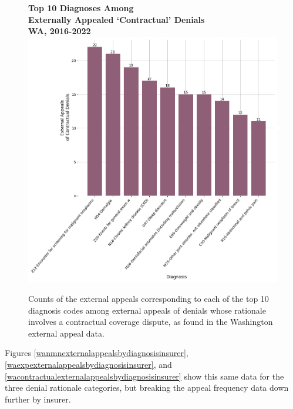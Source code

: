 \documentclass[12pt, a4paper,twoside,parskip=full]{report}
\theoremstyle{plain} %
\theoremstyle{definition} %
\theoremstyle{remark} %
\numberwithin{equation}{chapter}
\begin{document}
		\begin{figure}[h!]
			\centering
			\textbf{Top 10 Diagnoses Among}\\
			\textbf{Externally Appealed `Contractual' Denials}\\ 
			\textbf{WA, 2016-2022}\\
			\includegraphics[width=.8\textwidth]{images/wa_external_appeals/top_contractual_appeal_diagnoses.png}
			\caption{Counts of the external appeals corresponding to each of the top 10 diagnosis codes among external appeals of denials whose rationale involves a contractual coverage dispute, as found in the Washington external appeal data.}
			\label{wacontractualexternalappealsbydiagnosis}
		\end{figure}
	\clearpage
	
		Figures \ref{wanmnexternalappealsbydiagnosisinsurer}, \ref{waexpexternalappealsbydiagnosisinsurer}, and \ref{wacontractualexternalappealsbydiagnosisinsurer} show this same data for the three denial rationale categories, but breaking the appeal frequency data down further by insurer.
		
\end{document}

